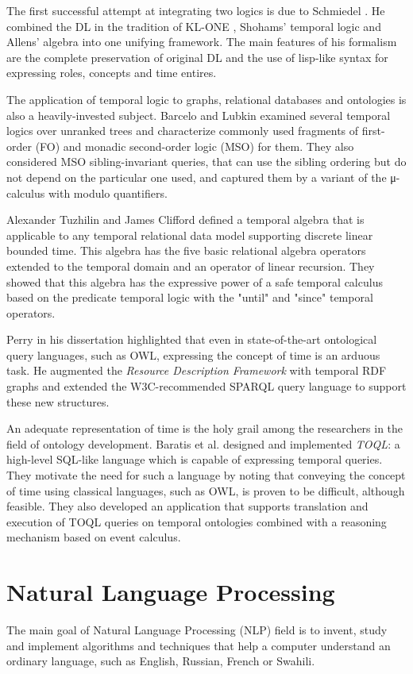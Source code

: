 The first successful attempt at integrating two logics is due to Schmiedel \cite{schmiedel}. He combined the DL in the tradition
of KL-ONE \cite{klone}, Shohams' \cite{shoh} temporal logic and Allens' \cite{allen} algebra into one unifying framework. The main
features of his formalism are the complete preservation of original DL and the use of lisp-like syntax for expressing roles,
concepts and time entires.

The application of temporal logic to graphs, relational databases and ontologies is also a heavily-invested subject.
Barcelo and Lubkin examined \cite{barcelo} several temporal logics over unranked trees and characterize commonly used fragments of
first-order (FO) and monadic second-order logic (MSO) for them. They also considered MSO sibling-invariant queries, that can use the
sibling ordering but do not depend on the particular one used, and captured them by a variant of the μ-calculus with modulo
quantifiers.

Alexander Tuzhilin and James Clifford defined \cite{clif} a temporal algebra that is applicable to any temporal relational data
model supporting discrete linear bounded time. This algebra has the five basic relational algebra operators extended to the
temporal domain and an operator of linear recursion. They showed that this algebra has the expressive power of a safe temporal
calculus based on the predicate temporal logic with the "until" and "since" temporal operators.

Perry in his dissertation \cite{perry} highlighted that even in state-of-the-art ontological query languages, such as OWL,
expressing the concept of time is an arduous task. He augmented the \textit{Resource Description Framework} with temporal RDF
graphs and extended the W3C-recommended SPARQL query language to support these new structures.

An adequate representation of time is the holy grail among the researchers in the field of ontology development.  Baratis et al.
\cite{toql} designed and implemented \textit{TOQL}: a high-level SQL-like language which is capable of expressing temporal
queries. They motivate the need for such a language by noting that conveying the concept of time using classical languages, such
as OWL, is proven to be difficult, although feasible. They also developed an application that supports translation and execution
of TOQL queries on temporal ontologies combined with a reasoning mechanism based on event calculus.

\section{Natural Language Processing}
The main goal of Natural Language Processing (NLP) field is to invent, study and implement algorithms and techniques that help a
computer understand an ordinary language, such as English, Russian, French or Swahili.

